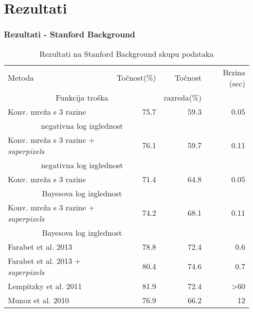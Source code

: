 \documentclass[utf8]{beamer}
\begin{document}
\section{Rezultati}

\begin{frame}
\frametitle{Rezultati - Stanford Background}

\begin{table}
\small
\centering

\begin{adjustbox}{center}
\begin{tabular}{l r r r}
  Metoda & Točnost(\%) & Točnost & Brzina (sec) \\
    \multicolumn{2}{c}{Funkcija troška} & razreda(\%) & \\[0.6em] \hline

  Konv. mreža s 3 razine & 75.7 & 59.3 & 0.05 \\
    \multicolumn{2}{c}{negativna log izglednost} & & \\ \hline
  Konv. mreža s 3 razine + \textit{superpixels} & 76.1 & 59.7 & 0.11 \\
    \multicolumn{2}{c}{negativna log izglednost} & & \\ \hline
  Konv. mreža s 3 razine & 71.4 & 64.8 & 0.05 \\
    \multicolumn{2}{c}{Bayesova log izglednost} & & \\ \hline
  Konv. mreža s 3 razine + \textit{superpixels} & 74.2 & 68.1 & 0.11 \\
    \multicolumn{2}{c}{Bayesova log izglednost} & & \\ \hline \hline
    
  Farabet et al. 2013 & 78.8 & 72.4 & 0.6 \\ \hline
  Farabet et al. 2013 + \textit{superpixels} & 80.4 & 74.6 & 0.7 \\ \hline
  Lempitzky et al. 2011 & 81.9 & 72.4 & >60 \\ \hline
  Munoz et al. 2010 & 76.9 & 66.2 & 12
\end{tabular}
\end{adjustbox}

\caption{Rezultati na Stanford Background skupu podataka}
\end{table}

\end{frame}

\end{document}
